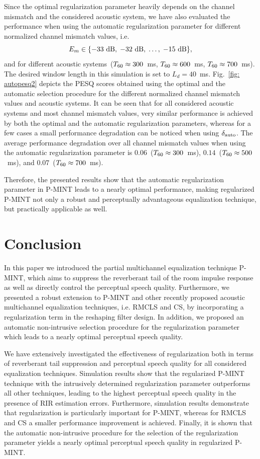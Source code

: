 \documentclass[draftcls,onecolumn,11pt]{IEEEtran}
\begin{document}
Since the optimal regularization parameter heavily depends on the channel mismatch and the considered acoustic system, we have also evaluated the performance when using the automatic regularization parameter for different normalized channel mismatch values, i.e.
\begin{equation}
  E_m \in \{ -33~{\rm dB}, \; -32~{\rm dB}, \; \ldots, \; -15~{\rm dB} \},
\end{equation}
and for different acoustic systems~($T_{\rm 60} \approx 300$~ms, $T_{\rm 60} \approx 600$~ms, $T_{\rm 60} \approx 700$~ms).
The desired window length in this simulation is set to $L_d = 40$~ms.
Fig.~\ref{fig: autopesq2} depicts the PESQ scores obtained using the optimal and the automatic selection procedure for the different normalized channel mismatch values and acoustic systems.
It can be seen that for all considered acoustic systems and most channel mismatch values, very similar performance is achieved by both the optimal and the automatic regularization parameters, whereas for a few cases a small performance degradation can be noticed when using $\delta_{\rm auto}$.
The average performance degradation over all channel mismatch values when using the automatic regularization parameter is $0.06$~($T_{\rm 60} \approx 300$~ms), $0.14$~($T_{\rm 60} \approx 500$~ms), and $0.07$~($T_{\rm 60} \approx 700$~ms).

Therefore, the presented results show that the automatic regularization parameter in P-MINT leads to a nearly optimal performance, making regularized P-MINT not only a robust and perceptually advantageous equalization technique, but practically applicable as well.


\section{Conclusion}
In this paper we introduced the partial multichannel equalization technique P-MINT, which aims to suppress the reverberant tail of the room impulse response as well as directly control the perceptual speech quality.
Furthermore, we presented a robust extension to P-MINT and other recently proposed acoustic multichannel equalization techniques, i.e. RMCLS and CS, by incorporating a regularization term in the reshaping filter design.
In addition, we proposed an automatic non-intrusive selection procedure for the regularization parameter which leads to a nearly optimal perceptual speech quality.

We have extensively investigated the effectiveness of regularization both in terms of reverberant tail suppression and perceptual speech quality for all considered equalization techniques.
Simulation results show that the regularized P-MINT technique with the intrusively determined regularization parameter outperforms all other techniques, leading to the highest perceptual speech quality in the presence of RIR estimation errors.
Furthermore, simulation results demonstrate that regularization is particularly important for P-MINT, whereas for RMCLS and CS a smaller performance improvement is achieved.
Finally, it is shown that the automatic non-intrusive procedure for the selection of the regularization parameter yields a nearly optimal perceptual speech quality in regularized P-MINT.
\end{document}

